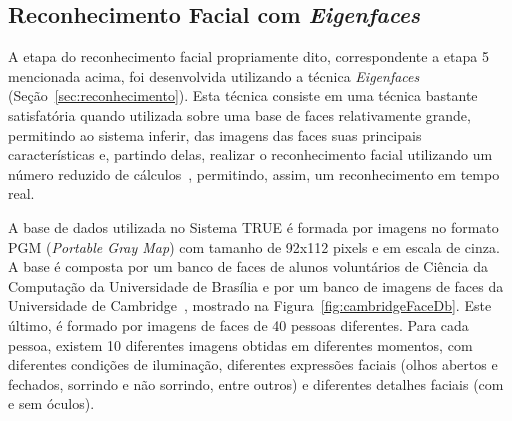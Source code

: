 	\subsection{Reconhecimento Facial com \textit{Eigenfaces}}

		A etapa do reconhecimento facial propriamente dito, correspondente a etapa 5 mencionada acima, foi desenvolvida utilizando a técnica \textit{Eigenfaces} (Seção~\ref{sec:reconhecimento}). Esta técnica consiste em uma técnica bastante satisfatória quando utilizada sobre uma base de faces relativamente grande, permitindo ao sistema inferir, das imagens das faces suas principais características e, partindo delas, realizar o reconhecimento facial utilizando um número reduzido de cálculos~\cite{artigo-eigenface}, permitindo, assim, um reconhecimento em tempo real.

		A base de dados utilizada no Sistema TRUE é formada por imagens no formato PGM (\textit{Portable Gray Map}) com tamanho de 92x112 pixels e em escala de cinza. A base é composta por um banco de faces de alunos voluntários de Ciência da Computação da Universidade de Brasília e por um banco de imagens de faces da Universidade de Cambridge~\cite{cambridgeFaceDb}, mostrado na Figura~\ref{fig:cambridgeFaceDb}. Este último, é formado por imagens de faces de 40 pessoas diferentes. Para cada pessoa, existem 10 diferentes imagens obtidas em diferentes momentos, com diferentes condições de iluminação, diferentes expressões faciais (olhos abertos e fechados, sorrindo e não sorrindo, entre outros) e diferentes detalhes faciais (com e sem óculos). 

